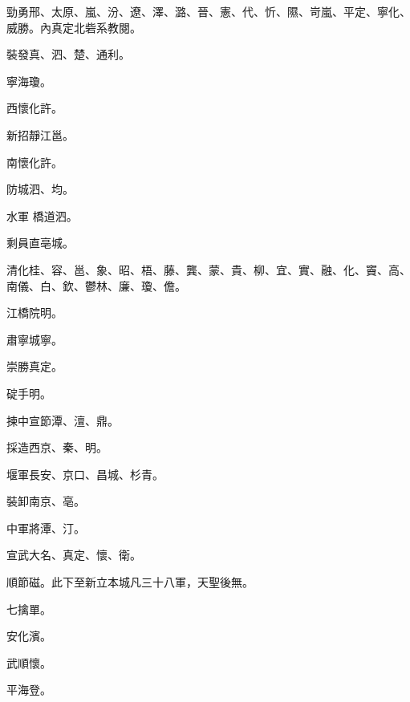 \begin{pinyinscope}
 勁勇邢、太原、嵐、汾、遼、澤、潞、晉、憲、代、忻、隰、岢嵐、平定、寧化、威勝。內真定北砦系教閱。



 裝發真、泗、楚、通利。



 寧海瓊。



 西懷化許。



 新招靜江邕。



 南懷化許。



 防城泗、均。



 水軍
 橋道泗。



 剩員直亳城。



 清化桂、容、邕、象、昭、梧、藤、龔、蒙、貴、柳、宜、實、融、化、竇、高、南儀、白、欽、鬱林、廉、瓊、儋。



 江橋院明。



 肅寧城寧。



 崇勝真定。



 碇手明。



 揀中宣節潭、澶、鼎。



 採造西京、秦、明。



 堰軍長安、京口、昌城、杉青。



 裝卸南京、亳。



 中軍將潭、汀。



 宣武大名、真定、懷、衛。



 順節磁。此下至新立本城凡三十八軍，天聖後無。



 七擒單。



 安化濱。



 武順懷。



 平海登。




\end{pinyinscope}
